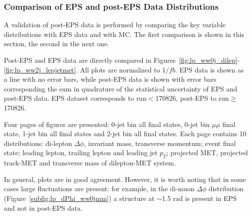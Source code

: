 
\subsubsection{Comparison of EPS and post-EPS Data Distributions}
A validation of post-EPS data is performed by comparing the key variable distributions with EPS data and with MC.
The first comparison is shown in this section, the second in the next one.

Post-EPS and EPS data are directly compared in Figures~\ref{fig:lp_ww0j_dilep}-\ref{fig:lp_ww2j_lepjetmet}. 
All plots are normalized to 1$/fb$. 
EPS data is shown as a line with no error bars, while post-EPS data is shown with error bars corresponding the sum in quadrature of the 
statistical uncertainty of EPS and post-EPS data. 
EPS dataset corresponds to run$<$170826, post-EPS to run$\geq$170826.

Four pages of figures are presented: 0-jet bin all final states, 0-jet bin $\mu\mu$ final state, 1-jet bin all final states and 2-jet bin all final states. 
Each page contains 10 distributions: di-lepton $\Delta\phi$, invariant mass, transverse momentum; event final state; leading lepton, trailing lepton 
and leading jet $p_T$; projected MET, projected track-MET and transverse mass of dilepton-MET system.

In general, plots are in good agreement. However, it is worth noting that in some cases large fluctuations are present: for example, in the di-muon   
$\Delta\phi$ distribution (Figure~\ref{subfig:lp_dPhi_ww0jmm}) a structure at $\sim$1.5 rad is present in EPS and not in post-EPS data.

\clearpage

